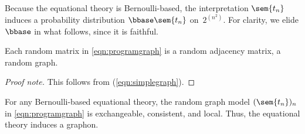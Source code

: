 Because the equational theory is Bernoulli-based, the
interpretation $\sem {t_n}$ induces a probability distribution $\bbase\sem{t_n}$
on~$2^{(n^2)}$. For clarity, we elide $\bbase$ in what follows, since
it is faithful. 
\begin{proposition}
  Each random matrix in \eqref{eqn:programgraph} is a random adjacency matrix, \ie a random graph. 
\end{proposition}
\begin{proof}[Proof note]This follows from (\ref{eqn:simplegraph}).\end{proof}
\begin{theorem}\label{thm:eq-theory-to-graphon}
  For any Bernoulli-based equational theory, the random graph model $(\sem {t_n})_n$ in \eqref{eqn:programgraph}
  is exchangeable, consistent, and local. Thus, the equational theory
  induces a graphon. 
\end{theorem}
